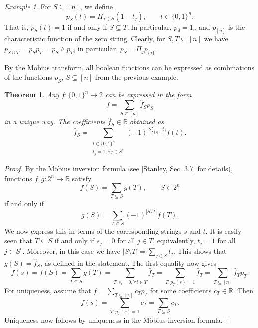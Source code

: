 \documentclass[12pt]{article}
\newtheorem{theorem}{Theorem}
\theoremstyle{definition}
\theoremstyle{remark}
\newtheorem{exm}{Example}
\begin{document}
\begin{exm}\label{ex:pS}
For $S\subseteq [n]$, we define
\[
p_S(t)=\Pi_{j\in S}(1-t_j),\qquad t\in \{0,1\}^n.
\]
That is, $p_S(t)=1$ if and only if $S\subseteq T$. In particular,
$p_\emptyset=1_n$ and $p_{[n]}$ is the characteristic function of the zero string.
Clearly, for $S,T\subseteq [n]$ we have $p_{S\cup T}=p_Sp_T=p_S\wedge p_T$, in particular,
$p_S=\Pi_jp_{\{j\}}$. 
\end{exm}

By the M\"obius transform, all boolean functions can be expressed as combinations of the functions $p_S$, $S\subseteq
[n]$ from the previous example.

\begin{theorem}\label{thm:basis} Any $f:\{0,1\}^n\to 2$ can be expressed  in the form 
\[
f=\sum_{S\subseteq [n]} \hat f_Sp_S
\]
in a unique way. The coefficients  $\hat f_S\in \mathbb R$ obtained as
\[
\hat f_S=\sum_{\substack{t\in \{0,1\}^n\\ t_j=1, \forall  j\in S^c}} (-1)^{\sum_{j\in
S}t_j}f(t).
\]

\end{theorem}

\begin{proof}  By the M\"obius inversion formula (see [Stanley, Sec. 3.7] for details),
functions $f, g: 2^n\to \mathbb R$ satisfy
\[
f(S)=\sum_{T\subseteq S} g(T),\qquad S\in 2^n
\]
if and only if 
\[
g(S)=\sum_{T\subseteq S}(-1)^{|S\setminus T|} f(T).
\]
We now express this in terms of the corresponding strings $s$ and $t$.
It is easily seen that $T\subseteq S$ if and only if
$s_j=0$ for all $j\in T$, equivalently, $t_j=1$ for all $j\in S^c$. Moreover,
in this case we have  $|S\setminus T|=\sum_{j\in S} t_j$. This shows that $g(S)=\hat f_S$,
as defined in the statement. The first equality now gives
\[
f(s)=f(S)=\sum_{T\subseteq S} g(T)=\sum_{T:s_i=0,\forall i\in T}\hat f_T=\sum_{T:
p_T(s)=1}\hat f_T=\sum_{T\subseteq [n]} \hat f_Tp_T.
\]
For uniqueness, assume that $f=\sum_{T\subseteq [n]} c_Tp_T$ for some coefficients $c_T\in
\mathbb R$. Then 
\[
f(s)=\sum_{T: p_T(s)=1}c_T=\sum_{T\subseteq S}c_T.
\]
Uniqueness now follows by  uniqueness in the M\"obius inversion formula.

\end{proof}





\end{document}
